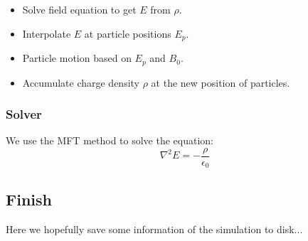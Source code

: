\begin{itemize}
\item Solve field equation to get $E$ from $\rho$.
\item Interpolate $E$ at particle positions $E_p$.
\item Particle motion based on $E_p$ and $B_0$.
\item Accumulate charge density $\rho$ at the new position of particles.
\end{itemize}

\subsubsection{Solver}

We use the MFT method to solve the equation:
\begin{equation}
\nabla^2 E = - \frac{\rho}{\epsilon_0}
\end{equation}

\subsection{Finish}

Here we hopefully save some information of the simulation to disk...
